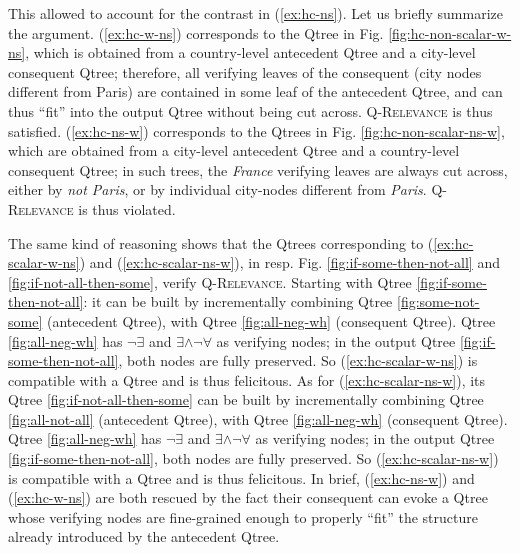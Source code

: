 	\begin{exe}
		\label{ex:q-relevance-conditional}
	\end{exe}
	
	This allowed to account for the contrast in (\ref{ex:hc-ns}). Let us briefly summarize the argument. (\ref{ex:hc-w-ns}) corresponds to the Qtree in Fig. \ref{fig:hc-non-scalar-w-ns}, which is obtained from a country-level antecedent Qtree and a city-level consequent Qtree; therefore, all verifying leaves of the consequent (city nodes different from Paris) are contained in some leaf of the antecedent Qtree, and can thus ``fit'' into the output Qtree without being cut across. \textsc{Q-Relevance} is thus satisfied.  (\ref{ex:hc-ns-w}) corresponds to the Qtrees in Fig. \ref{fig:hc-non-scalar-ns-w}, which are obtained from a city-level antecedent Qtree and a country-level consequent Qtree; in such trees, the \textit{France} verifying leaves are always cut across, either by \textit{not Paris}, or by individual city-nodes different from \textit{Paris}. \textsc{Q-Relevance} is thus violated.
	
	The same kind of reasoning shows that the Qtrees corresponding to (\ref{ex:hc-scalar-w-ns}) and (\ref{ex:hc-scalar-ns-w}), in resp. Fig. \ref{fig:if-some-then-not-all} and \ref{fig:if-not-all-then-some}, verify \textsc{Q-Relevance}. Starting with Qtree \ref{fig:if-some-then-not-all}: it can be built by incrementally combining  Qtree \ref{fig:some-not-some} (antecedent Qtree), with Qtree \ref{fig:all-neg-wh} (consequent Qtree). Qtree \ref{fig:all-neg-wh} has $\neg\exists$ and $\exists\wedge\neg\forall$ as verifying nodes; in the output Qtree \ref{fig:if-some-then-not-all}, both nodes are fully preserved. So (\ref{ex:hc-scalar-w-ns}) is compatible with a Qtree and is thus felicitous. As for (\ref{ex:hc-scalar-ns-w}), its Qtree \ref{fig:if-not-all-then-some} can be built by incrementally combining  Qtree \ref{fig:all-not-all} (antecedent Qtree), with Qtree \ref{fig:all-neg-wh} (consequent Qtree). Qtree \ref{fig:all-neg-wh} has $\neg\exists$ and $\exists\wedge\neg\forall$ as verifying nodes; in the output Qtree \ref{fig:if-some-then-not-all}, both nodes are fully preserved. So (\ref{ex:hc-scalar-ns-w}) is compatible with a Qtree and is thus felicitous. In brief, (\ref{ex:hc-ns-w}) and (\ref{ex:hc-w-ns}) are both rescued by the fact their consequent can evoke a Qtree whose verifying nodes are fine-grained enough to properly ``fit'' the structure already introduced by the antecedent Qtree.
	

